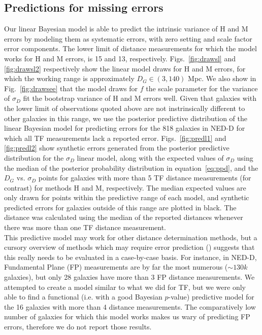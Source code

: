 \documentclass[a4paper,fleqn,usenatbib]{mnras}
\begin{document}
\subsection{Predictions for missing errors}
\label{sec:pred} 
Our linear Bayesian model is able to predict the intrinsic variance of H and M errors by modeling them as systematic errors, with zero setting and scale factor error components. The lower limit of distance measurements for which the model works for H and M errors, is 15 and 13, respectively. Figs.~\ref{fig:drawsl} and \ref{fig:drawsl2} respectively show the linear model draws for H and M errors, for which the working range is approximately $D_G\in(3,140)$ Mpc. We also show in Fig.~\ref{fig:drawsee} that the model draws for $f$ the scale parameter for the variance of $\sigma_D$ fit the bootstrap variance of H and M errors well. Given that galaxies with the lower limit of observations quoted above are not instrinsically different to other galaxies in this range, we use the posterior predictive distribution of the linear Bayesian model for predicting errors for the 818 galaxies in NED-D for which all TF measurements lack a reported error. Figs.~\ref{fig:predl1} and \ref{fig:predl2} show synthetic errors generated from the posterior predictive distribution for the $\sigma_D$ linear model, along with the expected values of $\sigma_D$ using the median of the posterior probability distribution in equation~\ref{eq:ppd}, and the $D_G$ vs. $\sigma_D$ points for galaxies with more than 5 TF distance measurements (for contrast) for methods H and M, respectively. The median expected values are only drawn for points within the predictive range of each model, and synthetic predicted errors for galaxies outside of this range are plotted in black. The distance was calculated using the median of the reported distances whenever there was more than one TF distance measurement.\\
This predictive model may work for other distance determination methods, but a cursory overview of methods which may require error prediction () suggests that this really needs to be evaluated in a case-by-case basis. For instance, in NED-D, Fundamental Plane (FP) measurements are by far the most numerous ($\sim130k$ galaxies), but only 28 galaxies have more than 3 FP distance measurements. We attempted to create a model similar to what we did for TF, but we were only able to find a functional (i.e. with a good Bayesian $p$-value) predictive model for the 16 galaxies with more than 4 distance measurements. The comparatively low number of galaxies for which this model works makes us wary of predicting FP errors, therefore we do not report those results.
\end{document}
